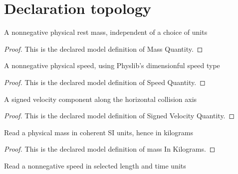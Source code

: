 \section{Declaration topology}
\begin{definition}
  \label{def:physics:phyx-mini-0511:phyxminiproblems-problemphyxmini0511-massquantity}
  A nonnegative physical rest mass, independent of a choice of units
\end{definition}
\begin{proof}
  This is the declared model definition of Mass Quantity.
\end{proof}
\begin{definition}
  \label{def:physics:phyx-mini-0511:phyxminiproblems-problemphyxmini0511-speedquantity}
  A nonnegative physical speed, using Physlib's dimensionful speed type
\end{definition}
\begin{proof}
  This is the declared model definition of Speed Quantity.
\end{proof}
\begin{definition}
  \label{def:physics:phyx-mini-0511:phyxminiproblems-problemphyxmini0511-signedvelocityquantity}
  A signed velocity component along the horizontal collision axis
\end{definition}
\begin{proof}
  This is the declared model definition of Signed Velocity Quantity.
\end{proof}
\begin{definition}
  \label{def:physics:phyx-mini-0511:phyxminiproblems-problemphyxmini0511-massinkilograms}
  Read a physical mass in coherent SI units, hence in kilograms
\end{definition}
\begin{proof}
  This is the declared model definition of mass In Kilograms.
\end{proof}
\begin{definition}
  \label{def:physics:phyx-mini-0511:phyxminiproblems-problemphyxmini0511-speedreadout}
  Read a nonnegative speed in selected length and time units
\end{definition}
